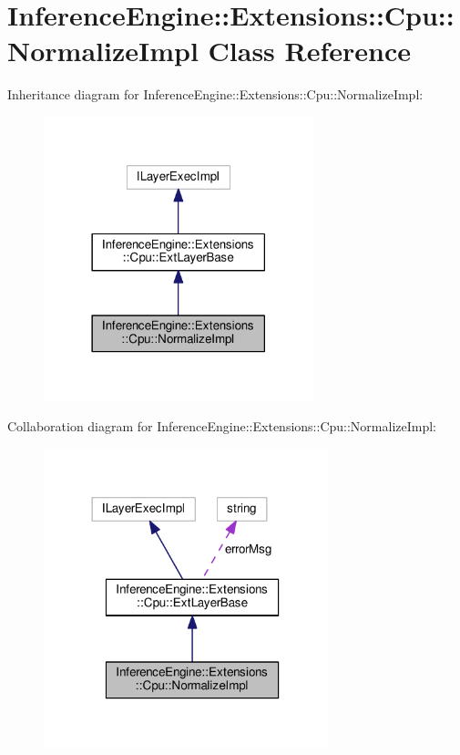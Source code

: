 \hypertarget{classInferenceEngine_1_1Extensions_1_1Cpu_1_1NormalizeImpl}{}\section{Inference\+Engine\+:\+:Extensions\+:\+:Cpu\+:\+:Normalize\+Impl Class Reference}
\label{classInferenceEngine_1_1Extensions_1_1Cpu_1_1NormalizeImpl}


Inheritance diagram for Inference\+Engine\+:\+:Extensions\+:\+:Cpu\+:\+:Normalize\+Impl\+:
\nopagebreak
\begin{figure}[H]
\begin{center}
\leavevmode
\includegraphics[width=222pt]{classInferenceEngine_1_1Extensions_1_1Cpu_1_1NormalizeImpl__inherit__graph}
\end{center}
\end{figure}


Collaboration diagram for Inference\+Engine\+:\+:Extensions\+:\+:Cpu\+:\+:Normalize\+Impl\+:
\nopagebreak
\begin{figure}[H]
\begin{center}
\leavevmode
\includegraphics[width=234pt]{classInferenceEngine_1_1Extensions_1_1Cpu_1_1NormalizeImpl__coll__graph}
\end{center}
\end{figure}
